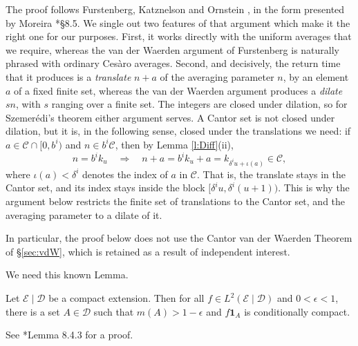 The proof follows Furstenberg, Katznelson and Ornstein \cite{MR670131}, in the form presented by Moreira \cite{MoreiraNotes}*{\S 8.5}.  
We single out two features of that argument which make it the right one for our purposes.  
First, it works directly with the uniform averages that we require, whereas the van der Waerden argument of 
Furstenberg \cite{MR0498471} is naturally phrased with ordinary Ces\`aro averages.  
Second, and decisively, the return time that it produces is a \emph{translate} $n+a$ of the averaging parameter $n$, 
by an element $a$ of a fixed finite set, whereas the van der Waerden argument produces a \emph{dilate} $sn$, with $s$ 
ranging over a finite set.  The integers are closed under dilation, so for Szemer\'edi's theorem either argument serves.  
A Cantor set is not closed under dilation, but it is, in the following sense, closed under the translations we need: 
if $a \in \mathcal C\cap [0,b ^{i})$ and $n \in b ^{i}\mathcal C$, then by Lemma \ref{l:Diff}(ii), 
\begin{equation} \label{e:absorb}
n = b ^{i}k_u \quad\Longrightarrow\quad n+a = b ^{i}k_u + a = k _{\delta ^{i} u + \iota (a)} \in \mathcal C , 
\end{equation}
where $\iota (a) < \delta ^{i}$ denotes the index of $a$ in $\mathcal C$.  
That is, the translate stays in the Cantor set, and its index stays inside the block $[\delta ^{i}u , \delta ^{i}(u+1))$.  
This is why the argument below restricts the finite set of translations to the Cantor set, and the averaging parameter to a dilate of it.  

\begin{remark}
In particular, the proof below does not use the Cantor van der Waerden Theorem of \S\ref{sec:vdW}, 
which is retained as a result of independent interest.  
\end{remark}

We need this known Lemma. 

\begin{lemma} \label{l:localize} Let $\mathcal E\mid \mathcal D$ be a compact extension. 
Then for all $f\in L^2(\mathcal E\mid \mathcal D)$ and $0< \epsilon <1$, there is a set $A \in \mathcal D$ such that $m(A)>1- \epsilon $ and $f \mathbf{1}_{A}$ is conditionally compact. 
\end{lemma}

See \cite{MoreiraNotes}*{Lemma 8.4.3} for a proof.

